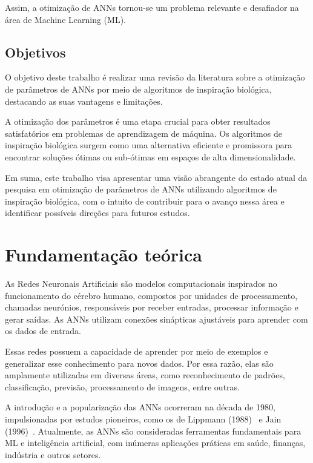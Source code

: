 \documentclass[conference]{IEEEtran}
\begin{document}
Assim, a otimização de ANNs tornou-se um problema relevante e desafiador na área de Machine Learning (ML).

\subsection{Objetivos}

O objetivo deste trabalho é realizar uma revisão da literatura sobre a otimização de parâmetros de ANNs por meio de algoritmos de inspiração biológica, destacando as suas vantagens e limitações. 

A otimização dos parâmetros é uma etapa crucial para obter resultados satisfatórios em problemas de aprendizagem de máquina. Os algoritmos de inspiração biológica surgem como uma alternativa eficiente e promissora para encontrar soluções ótimas ou sub-ótimas em espaços de alta dimensionalidade.

Em suma, este trabalho visa apresentar uma visão abrangente do estado atual da pesquisa em otimização de parâmetros de ANNs utilizando algoritmos de inspiração biológica, com o intuito de contribuir para o avanço nessa área e identificar possíveis direções para futuros estudos.

\section{Fundamentação teórica}

As Redes Neuronais Artificiais são modelos computacionais inspirados no funcionamento do cérebro humano, compostos por unidades de processamento, chamadas neurónios, responsáveis por receber entradas, processar informação e gerar saídas. As ANNs utilizam conexões sinápticas ajustáveis para aprender com os dados de entrada.~\cite{Lippmann1988AnNets}

Essas redes possuem a capacidade de aprender por meio de exemplos e generalizar esse conhecimento para novos dados. Por essa razão, elas são amplamente utilizadas em diversas áreas, como reconhecimento de padrões, classificação, previsão, processamento de imagens, entre outras.~\cite{Jain1996ArtificialTutorial}

A introdução e a popularização das ANNs ocorreram na década de 1980, impulsionadas por estudos pioneiros, como os de Lippmann (1988)~\cite{Lippmann1988AnNets} e Jain (1996)~\cite{Jain1996ArtificialTutorial}. Atualmente, as ANNs são consideradas ferramentas fundamentais para ML e inteligência artificial, com inúmeras aplicações práticas em saúde, finanças, indústria e outros setores.
\end{document}

